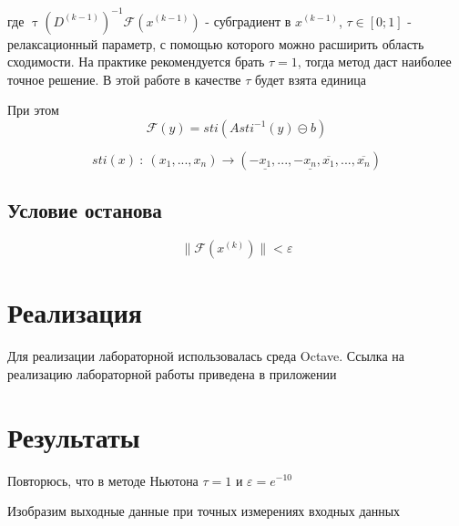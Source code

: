 \documentclass[12pt,a4paper]{article}
\begin{document}
            где $\uptau(D^{(k-1)})^{-1}\mathcal{F}(x^{(k-1)})$ - субградиент в $x^{(k-1)}$, $\tau \in [0;1]$ - релаксационный параметр, с помощью которого можно расширить область сходимости. На практике рекомендуется брать $\tau=1$, тогда метод даст наиболее точное решение. В этой работе в качестве $\tau$ будет взята единица
            
            При этом 
            \begin{equation}
                \mathcal{F}(y) = \textit{sti}(A\textit{sti}^{-1}(y) \circleddash b)
            \end{equation}
            
            \begin{equation}
                \textit{sti}(x) \: : \: (x_1, ... , x_n) \xrightarrow{} ( -\underline{x_1}, ... , -\underline{x_n}, \overline{x_1}, ... , \overline{x_n})
            \end{equation}
            
            \subsection{Условие останова}
                \begin{equation}
                    \| \mathcal{F}(x^{(k)}) \| < \varepsilon
                \end{equation}
            
    \section{Реализация}
        Для реализации лабораторной использовалась среда Octave. Ссылка на реализацию лабораторной работы приведена в приложении
        
    \section{Результаты}
        Повторюсь, что в методе Ньютона $\tau=1$ и $\varepsilon=e^{-10}$
    
        Изобразим выходные данные при точных измерениях входных данных
        
\end{document}
